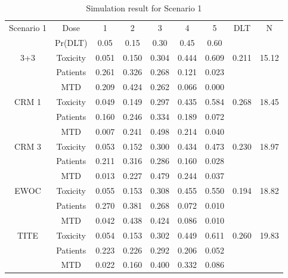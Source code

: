 \documentclass[12pt]{article}
\begin{document}
\begin{table}[H] \label{tblScn1}
  \centering
  \begin{tabular}{|cc|c|c|c|c|c|c|c|} 
    \hline
    Scenario 1 & Dose & 1 & 2 & 3 & 4 & 5 & DLT & N \\
               & Pr(DLT) & 0.05 & 0.15 & 0.30 & 0.45 & 0.60 & & \\
    \hline
    3+3 & Toxicity & 0.051 & 0.150 & 0.304 & 0.444 & 0.609 & 0.211 & 15.12 \\
               & Patients & 0.261 & 0.326 & 0.268 & 0.121 & 0.023 & & \\
               & MTD & 0.209 & 0.424 & 0.262 & 0.066 & 0.000 & & \\
    \hline
    CRM 1 & Toxicity & 0.049 & 0.149 & 0.297 & 0.435 & 0.584 & 0.268 & 18.45 \\
               & Patients & 0.160 & 0.246 & 0.334 & 0.189 & 0.072 & & \\
               & MTD & 0.007 & 0.241 & 0.498 & 0.214 & 0.040 & & \\
    \hline
    CRM 3 & Toxicity & 0.053 & 0.152 & 0.300 & 0.434 & 0.473 & 0.230 & 18.97 \\
               & Patients  & 0.211 & 0.316 & 0.286 & 0.160 & 0.028 & & \\
               & MTD & 0.013 & 0.227 & 0.479 & 0.244 & 0.037 & & \\
    \hline
    EWOC & Toxicity & 0.055 & 0.153 & 0.308 & 0.455 & 0.550 & 0.194 & 18.82 \\
               & Patients & 0.270 & 0.381 & 0.268 & 0.072 & 0.010 & & \\
               & MTD & 0.042 & 0.438 & 0.424 & 0.086 & 0.010 & & \\
    \hline
    TITE & Toxicity & 0.054 & 0.153 & 0.302 & 0.449 & 0.611 & 0.260 & 19.83 \\
               & Patients & 0.223 & 0.226 & 0.292 & 0.206 & 0.052 & & \\
               & MTD & 0.022 & 0.160 & 0.400 & 0.332 & 0.086 & & \\
    \hline
  \end{tabular}
  \caption{Simulation result for Scenario 1}
\end{table}
\end{document}
